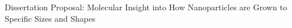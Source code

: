 Dissertation Proposal: Molecular Insight into How Nanoparticles are Grown to Specific Sizes and Shapes